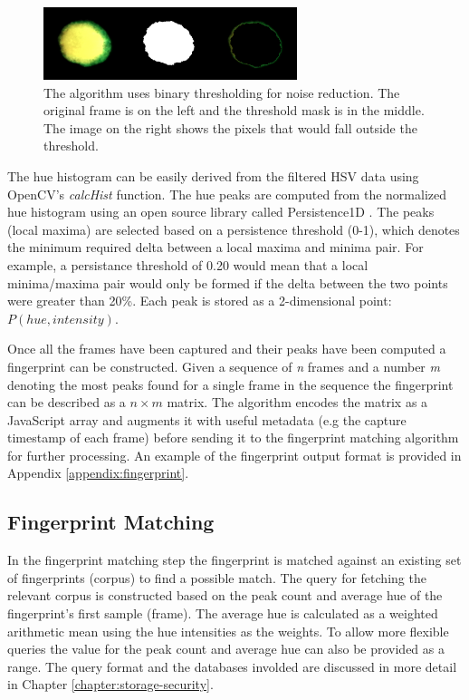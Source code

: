 \documentclass[thesis.tex]{subfiles}
\begin{document}
\begin{figure}[h]
\centering \includegraphics[width=\textwidth,height=\textheight,keepaspectratio=true]{images/design_implementation/binary_thresholding}
\caption{The algorithm uses binary thresholding for noise reduction. The original frame is on the left and the threshold mask is in the middle. The image on the right shows the pixels that would fall outside the threshold.\label{figure:binary-thresholding}}
\end{figure}

The hue histogram can be easily derived from the filtered HSV data using OpenCV's \emph{calcHist} function. The hue peaks are computed from the normalized hue histogram using an open source library called Persistence1D \cite{persistence1d}. The peaks (local maxima) are selected based on a persistence threshold (0-1), which denotes the minimum required delta between a local maxima and minima pair. For example, a persistance threshold of 0.20 would mean that a local minima/maxima pair would only be formed if the delta between the two points were greater than 20\%. Each peak is stored as a 2-dimensional point: $P(hue, intensity)$.

Once all the frames have been captured and their peaks have been computed a fingerprint can be constructed. Given a sequence of \emph{n} frames and a number \emph{m} denoting the most peaks found for a single frame in the sequence the fingerprint can be described as a $n \times m$ matrix. The algorithm encodes the matrix as a JavaScript array and augments it with useful metadata (e.g the capture timestamp of each frame) before sending it to the fingerprint matching algorithm for further processing. An example of the fingerprint output format is provided in Appendix \ref{appendix:fingerprint}.

\subsection{Fingerprint Matching}

In the fingerprint matching step the fingerprint is matched against an existing set of fingerprints (corpus) to find a possible match. The query for fetching the relevant corpus is constructed based on the peak count and average hue of the fingerprint's first sample (frame). The average hue is calculated as a weighted arithmetic mean using the hue intensities as the weights. To allow more flexible queries the value for the peak count and average hue can also be provided as a range. The query format and the databases involded are discussed in more detail in Chapter \ref{chapter:storage-security}.
\end{document}
